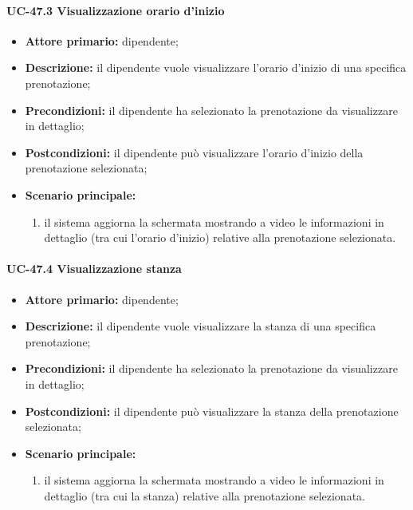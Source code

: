 \paragraph{UC-47.3 Visualizzazione orario d'inizio}

    \begin{itemize}
        \item \textbf{Attore primario:} dipendente;

        \item \textbf{Descrizione:} il dipendente vuole visualizzare l'orario d'inizio di una specifica prenotazione;

        \item \textbf{Precondizioni:} il dipendente ha selezionato la prenotazione da visualizzare in dettaglio;

        \item \textbf{Postcondizioni:} il dipendente può visualizzare l'orario d'inizio della prenotazione selezionata;

        \item \textbf{Scenario principale:}
            \begin{enumerate}
                 \item il sistema aggiorna la schermata mostrando a video le informazioni in dettaglio (tra cui l'orario d'inizio) relative alla prenotazione selezionata.
            \end{enumerate}
    \end{itemize} 

\paragraph{UC-47.4 Visualizzazione stanza}

    \begin{itemize}
        \item \textbf{Attore primario:} dipendente;

        \item \textbf{Descrizione:} il dipendente vuole visualizzare la stanza di una specifica prenotazione;

        \item \textbf{Precondizioni:} il dipendente ha selezionato la prenotazione da visualizzare in dettaglio;

        \item \textbf{Postcondizioni:} il dipendente può visualizzare la stanza della prenotazione selezionata;

        \item \textbf{Scenario principale:}
            \begin{enumerate}
                 \item il sistema aggiorna la schermata mostrando a video le informazioni in dettaglio (tra cui la stanza) relative alla prenotazione selezionata.
            \end{enumerate}
    \end{itemize} 

